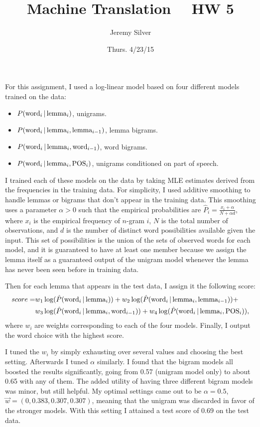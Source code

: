 \documentclass[11pt, oneside]{article}      %
\title{Machine Translation \, \textemdash \, HW 5}
\author{Jeremy Silver}
\date{Thurs. 4/23/15}                          %
\newcommand{\word}{\textnormal{word}}
\newcommand{\lemma}{\textnormal{lemma}}
\begin{document}
\maketitle

For this assignment, I used a log-linear model based on four different models trained on the data:
\begin{itemize}
\item $P(\word_i \, | \, \lemma_i)$, unigrams.
\item $P(\word_i \, | \, \lemma_i, \lemma_{i - 1})$, lemma bigrams.
\item $P(\word_i \, | \, \lemma_i, \word_{i - 1})$, word bigrams.
\item $P(\word_i \, | \, \lemma_i, \textnormal{POS}_i)$, unigrams conditioned on part of speech.
\end{itemize}

I trained each of these models on the data by taking MLE estimates derived from the frequencies in the training data.  For simplicity, I used additive smoothing to handle lemmas or bigrams that don't appear in the training data.  This smoothing uses a parameter $\alpha > 0$ such that the empirical probabilities are $\hat{P}_i = \frac{x_i + \alpha}{N + \alpha d}$, where $x_i$ is the empirical frequency of $n$-gram $i$, $N$ is the total number of observations, and $d$ is the number of distinct word possibilities available given the input.  This set of possibilities is the union of the sets of observed words for each model, and it is guaranteed to have at least one member because we assign the lemma itself as a guaranteed output of the unigram model whenever the lemma has never been seen before in training data. 

Then for each lemma that appears in the test data, I assign it the following score:
\begin{eqnarray*}
score = & w_1 \log(\hat{P}(\word_i \, | \, \lemma_i)) + w_2 \log(\hat{P}(\word_i \, | \, \lemma_i, \lemma_{i - 1})) + \\ 
& w_3 \log(\hat{P}(\word_i \, | \, \lemma_i, \word_{i - 1})) + w_4 \log(\hat{P}(\word_i \, | \, \lemma_i, \textnormal{POS}_i)),
\end{eqnarray*}
where $w_i$ are weights corresponding to each of the four models.  Finally, I output the word choice with the highest score.

I tuned the $w_i$ by simply exhausting over several values and choosing the best setting.  Afterwards I tuned $\alpha$ similarly.  I found that the bigram models all boosted the results significantly, going from 0.57 (unigram model only) to about 0.65 with any of them.  The added utility of having three different bigram models was minor, but still helpful.  My optimal settings came out to be $\alpha = 0.5$, $\vec{w} = (0, 0.383, 0.307, 0.307)$, meaning that the unigram was discarded in favor of the stronger models.  With this setting I attained a test score of 0.69 on the test data.
\end{document}
